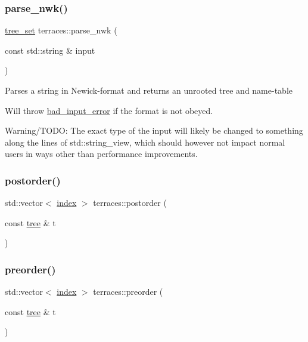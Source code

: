 \subsubsection{\texorpdfstring{parse\+\_\+nwk()}{parse\_nwk()}}
{\footnotesize\ttfamily \hyperlink{structterraces_1_1tree__set}{tree\+\_\+set} terraces\+::parse\+\_\+nwk (\begin{DoxyParamCaption}\item[{const std\+::string \&}]{input }\end{DoxyParamCaption})}

Parses a string in Newick-\/format and returns an unrooted tree and name-\/table

Will throw \hyperlink{classterraces_1_1bad__input__error}{bad\+\_\+input\+\_\+error} if the format is not obeyed.

Warning/\+T\+O\+DO\+: The exact type of the input will likely be changed to something along the lines of std\+::string\+\_\+view, which should however not impact normal users in ways other than performance improvements. \mbox{\label{namespaceterraces_ac51a269450af323210628bd90b96c694}} 
\subsubsection{\texorpdfstring{postorder()}{postorder()}}
{\footnotesize\ttfamily std\+::vector$<$ \hyperlink{namespaceterraces_adbc33ccb543d1634e96d0eb02e472c77}{index} $>$ terraces\+::postorder (\begin{DoxyParamCaption}\item[{const \hyperlink{namespaceterraces_a07aaf7feec4a22c6cdefc14c5a81bdd0}{tree} \&}]{t }\end{DoxyParamCaption})}

\mbox{\label{namespaceterraces_a24dbd28eb2657b6dd98233b26b20b93f}} 
\subsubsection{\texorpdfstring{preorder()}{preorder()}}
{\footnotesize\ttfamily std\+::vector$<$ \hyperlink{namespaceterraces_adbc33ccb543d1634e96d0eb02e472c77}{index} $>$ terraces\+::preorder (\begin{DoxyParamCaption}\item[{const \hyperlink{namespaceterraces_a07aaf7feec4a22c6cdefc14c5a81bdd0}{tree} \&}]{t }\end{DoxyParamCaption})}

